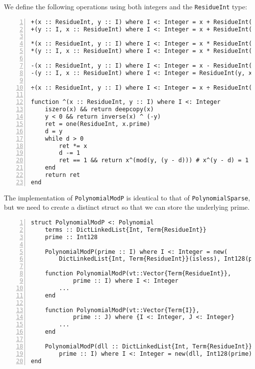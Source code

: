 \documentclass{article}
\theoremstyle{plain}
\numberwithin{theorem}{section}
\numberwithin{example}{section}
\theoremstyle{definition}
\numberwithin{definition}{section}
\begin{document}
We define the following operations using both integers and the
\texttt{ResidueInt} type:

\begin{codebox}
    \begin{Verbatim}[numbers=left,xleftmargin=5mm]
+(x :: ResidueInt, y :: I) where I <: Integer = x + ResidueInt(y, x.prime)
+(y :: I, x :: ResidueInt) where I <: Integer = x + ResidueInt(y, x.prime)

*(x :: ResidueInt, y :: I) where I <: Integer = x * ResidueInt(y, x.prime)
*(y :: I, x :: ResidueInt) where I <: Integer = x * ResidueInt(y, x.prime)

-(x :: ResidueInt, y :: I) where I <: Integer = x - ResidueInt(y, x.prime)
-(y :: I, x :: ResidueInt) where I <: Integer = ResidueInt(y, x.prime) - x

÷(x :: ResidueInt, y :: I) where I <: Integer = x ÷ ResidueInt(y, x.prime)

function ^(x :: ResidueInt, y :: I) where I <: Integer
    iszero(x) && return deepcopy(x)
    y < 0 && return inverse(x) ^ (-y)
    ret = one(ResidueInt, x.prime)
    d = y
    while d > 0
        ret *= x
        d -= 1
        ret == 1 && return x^(mod(y, (y - d))) # x^(y - d) = 1
    end
    return ret
end
    \end{Verbatim}
\end{codebox}

The implementation of \texttt{PolynomialModP} is identical to that of
\texttt{PolynomialSparse}, but we need to create a distinct struct so that we
can store the underlying prime.

\begin{codebox}
    \begin{Verbatim}[numbers=left,xleftmargin=5mm]
struct PolynomialModP <: Polynomial
    terms :: DictLinkedList{Int, Term{ResidueInt}}
    prime :: Int128
    
    PolynomialModP(prime :: I) where I <: Integer = new(
        DictLinkedList{Int, Term{ResidueInt}}(isless), Int128(prime))

    function PolynomialModP(vt::Vector{Term{ResidueInt}},
            prime :: I) where I <: Integer
        ...
    end

    function PolynomialModP(vt::Vector{Term{I}},
            prime :: J) where {I <: Integer, J <: Integer}
        ...
    end

    PolynomialModP(dll :: DictLinkedList{Int, Term{ResidueInt}},
        prime :: I) where I <: Integer = new(dll, Int128(prime))
end
    \end{Verbatim}
\end{codebox}
\end{document}
